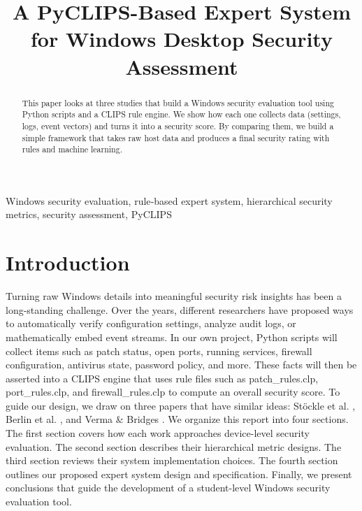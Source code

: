 \documentclass[conference, letterpaper]{IEEEtran}
\begin{document}
    \title{A PyCLIPS-Based Expert System for Windows Desktop Security Assessment}

    \author{
    }

    \maketitle

    \begin{abstract}
        This paper looks at three studies that build a Windows security evaluation tool using Python scripts and a CLIPS rule engine. We show how each one collects data (settings, logs, event vectors) and turns it into a security score. By comparing them, we build a simple framework that takes raw host data and produces a final security rating with rules and machine learning.
    \end{abstract}

    \begin{IEEEkeywords}
        Windows security evaluation, rule‐based expert system, hierarchical security metrics, security assessment, PyCLIPS
    \end{IEEEkeywords}

    \IEEEpeerreviewmaketitle

    \section{Introduction}
    Turning raw Windows details into meaningful security risk insights has been a long-standing challenge. Over the years, different researchers have proposed ways to automatically verify configuration settings, analyze audit logs, or mathematically embed event streams. In our own project, Python scripts will collect items such as patch status, open ports, running services, firewall configuration, antivirus state, password policy, and more. These facts will then be asserted into a CLIPS engine that uses rule files such as patch\_rules.clp, port\_rules.clp, and firewall\_rules.clp to compute an overall security score. To guide our design, we draw on three papers that have similar ideas: Stöckle et al. \cite{b1}, Berlin et al. \cite{b2}, and Verma \& Bridges \cite{b3}. We organize this report into four sections. The first section covers how each work approaches device-level security evaluation. The second section describes their hierarchical metric designs. The third section reviews their system implementation choices. The fourth section outlines our proposed expert system design and specification. Finally, we present conclusions that guide the development of a student-level Windows security evaluation tool.
\end{document}
